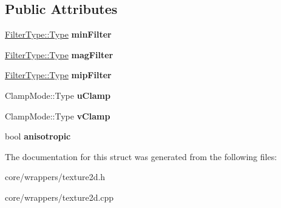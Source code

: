\subsection*{Public Attributes}
\begin{DoxyCompactItemize}
\item 
\hypertarget{struct_tempest_1_1_texture2d_1_1_sampler_aa7eb38c84f241f72c76492aea0dd8aaf}{\hyperlink{struct_tempest_1_1_abstract_texture_1_1_filter_type_aa28dcbdc63244fe43cfb7258f6996978}{Filter\+Type\+::\+Type} {\bfseries min\+Filter}}\label{struct_tempest_1_1_texture2d_1_1_sampler_aa7eb38c84f241f72c76492aea0dd8aaf}

\item 
\hypertarget{struct_tempest_1_1_texture2d_1_1_sampler_aa3ddeabe7f88a250e153ed37345b9e07}{\hyperlink{struct_tempest_1_1_abstract_texture_1_1_filter_type_aa28dcbdc63244fe43cfb7258f6996978}{Filter\+Type\+::\+Type} {\bfseries mag\+Filter}}\label{struct_tempest_1_1_texture2d_1_1_sampler_aa3ddeabe7f88a250e153ed37345b9e07}

\item 
\hypertarget{struct_tempest_1_1_texture2d_1_1_sampler_aa4f3759e31e6a85c252624e1288d315f}{\hyperlink{struct_tempest_1_1_abstract_texture_1_1_filter_type_aa28dcbdc63244fe43cfb7258f6996978}{Filter\+Type\+::\+Type} {\bfseries mip\+Filter}}\label{struct_tempest_1_1_texture2d_1_1_sampler_aa4f3759e31e6a85c252624e1288d315f}

\item 
\hypertarget{struct_tempest_1_1_texture2d_1_1_sampler_a00fef1b75bd0925214bf4e2553875d2f}{Clamp\+Mode\+::\+Type {\bfseries u\+Clamp}}\label{struct_tempest_1_1_texture2d_1_1_sampler_a00fef1b75bd0925214bf4e2553875d2f}

\item 
\hypertarget{struct_tempest_1_1_texture2d_1_1_sampler_a0b90751d5b068224daf0b5cccd736de9}{Clamp\+Mode\+::\+Type {\bfseries v\+Clamp}}\label{struct_tempest_1_1_texture2d_1_1_sampler_a0b90751d5b068224daf0b5cccd736de9}

\item 
\hypertarget{struct_tempest_1_1_texture2d_1_1_sampler_a46bc3491b0acae4d62043c16e20d6aff}{bool {\bfseries anisotropic}}\label{struct_tempest_1_1_texture2d_1_1_sampler_a46bc3491b0acae4d62043c16e20d6aff}

\end{DoxyCompactItemize}


The documentation for this struct was generated from the following files\+:\begin{DoxyCompactItemize}
\item 
core/wrappers/texture2d.\+h\item 
core/wrappers/texture2d.\+cpp\end{DoxyCompactItemize}
